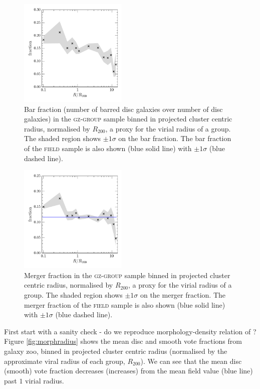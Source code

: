 \documentclass[useAMS,usenatbib]{mn2e}
\begin{document}
\begin{figure}
\includegraphics[width=0.46\textwidth]{bar_fraction_over_disc_trend_with_log_radius.pdf}
\caption{Bar fraction (number of barred disc galaxies over number of disc galaxies) in the \textsc{gz-group} sample binned in projected cluster centric radius, normalised by $R_{200}$, a proxy for the virial radius of a group. The shaded region shows $\pm1\sigma$ on the bar fraction. The bar fraction of the \textsc{field} sample is also shown (blue solid line) with $\pm1\sigma$ (blue dashed line).}
\label{fig:barradius}
\end{figure}

\begin{figure}
\includegraphics[width=0.46\textwidth]{merger_fraction_trend_with_log_radius_compare_field.pdf}
\caption{Merger fraction in the \textsc{gz-group} sample binned in projected cluster centric radius, normalised by $R_{200}$, a proxy for the virial radius of a group. The shaded region shows $\pm1\sigma$ on the merger fraction. The merger fraction of the \textsc{field} sample is also shown (blue solid line) with $\pm1\sigma$ (blue dashed line).}
\label{fig:mergerradius}
\end{figure}

First start with a sanity check - do we reproduce morphology-density relation of \citealt{dressler80}? Figure \ref{fig:morphradius} shows the mean disc and smooth vote fractions from galaxy zoo, binned in projected cluster centric radius (normalised by the approximate viral radius of each group, $R_{200}$). We can see that the mean disc (smooth) vote fraction decreases (increases) from the mean field value (blue line) past $1$ virial radius.
\end{document}
